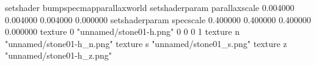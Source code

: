 setshader bumpspecmapparallaxworld
setshaderparam parallaxscale 0.004000 0.004000 0.004000 0.000000
setshaderparam specscale 0.400000 0.400000 0.400000 0.000000
texture 0 "unnamed/stone01-h.png" 0 0 0 1
texture n "unnamed/stone01-h_n.png"
texture s "unnamed/stone01_s.png"
texture z "unnamed/stone01-h_z.png"